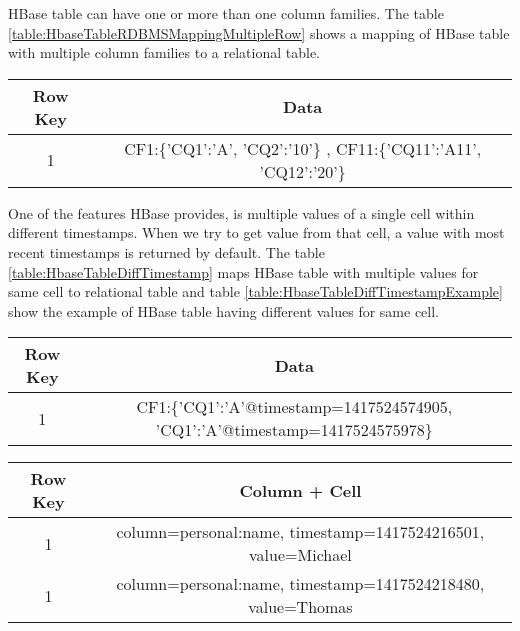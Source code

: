 \documentclass[11pt,a4paper,bibtotoc,idxtotoc,headsepline,footsepline,footexclude,BCOR12mm,DIV13]{scrbook}
\begin{document}
HBase table can have one or more than one column families. The table \ref{table:HbaseTableRDBMSMappingMultipleRow} shows a mapping of HBase table with multiple column families to a relational table.

\begin{table*}[htb!]
	\centering
	\begin{tabular}{|c|c|}
		\hline
		\textbf{Row Key} & \textbf{Data}\\
		\hline
		1 & CF1:\{'CQ1':'A', 'CQ2':'10'\}
		, CF11:\{'CQ11':'A11', 'CQ12':'20'\}\\

		\hline
	\end{tabular}
	\caption{HBase table with more than one CF}
	\label{table:HbaseTableRDBMSMappingMultipleRow}
\end{table*}

One of the features HBase provides, is multiple values of a single cell within different timestamps. When we try to get value from that cell, a value with most recent timestamps is returned by default.  The table \ref{table:HbaseTableDiffTimestamp} maps HBase table with multiple values for same cell to relational table and table \ref{table:HbaseTableDiffTimestampExample} show the example of HBase table having different values for same cell.

\begin{table*}[htb!]
	\centering
	\begin{tabular}{|c|c|}
		\hline
		\textbf{Row Key} & \textbf{Data}\\
		\hline
		1 & CF1:\{'CQ1':'A'@timestamp=1417524574905, 'CQ1':'A'@timestamp=1417524575978\}\\
	
		
		\hline
	\end{tabular}
	\caption{HBase table with different values at different timestamp}
	\label{table:HbaseTableDiffTimestamp}
\end{table*}

\begin{table*}[htb!]
	\centering
	\begin{tabular}{|c|c|}
		\hline
		\textbf{Row Key} & \textbf{Column + Cell}\\
		\hline
		1 & column=personal:name, timestamp=1417524216501, value=Michael\\
		1 & column=personal:name, timestamp=1417524218480, value=Thomas\\
		
		\hline
	\end{tabular}
	\caption{HBase table with different values at different timestamp example}
	\label{table:HbaseTableDiffTimestampExample}
\end{table*}
\end{document}
